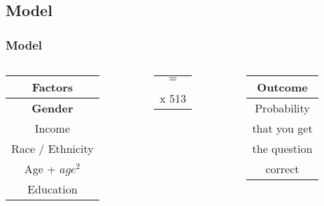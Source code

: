 \documentclass[pdf]{beamer}
\begin{document}
\subsection{Model}
\begin{frame}
\frametitle{Model}
  \begin{columns}

    \begin{column}{0.25\textwidth}
       \begin{tabular}{c}  %
         \hline   %
         Factors          \\
         \hline   %
         \textbf{Gender}           \\
         Income           \\
         Race / Ethnicity \\
         Age + $age^2$    \\
         Education        \\
         \hline  %
         \end{tabular}
    \end{column}

    \begin{column}{0.05\textwidth}
      \begin{tabular}{c}
        \LARGE{$ = $} \\
        \\
        x 513
      \end{tabular}
    \end{column}

    \begin{column}{0.2\textwidth}
       \begin{tabular}{c}  %
         \hline   %
         Outcome        \\
         \hline   %
         Probability      \\
         that you get     \\
         the question     \\
         correct          \\
         \hline  %
      \end{tabular}
    \end{column}


\end{columns}
\end{frame}
\end{document}

